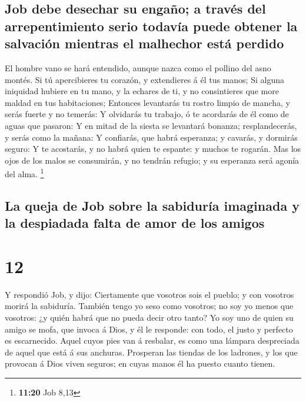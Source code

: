 \hypertarget{job-debe-desechar-su-engauxf1o-a-travuxe9s-del-arrepentimiento-serio-todavuxeda-puede-obtener-la-salvaciuxf3n-mientras-el-malhechor-estuxe1-perdido}{%
\subsection{Job debe desechar su engaño; a través del arrepentimiento
serio todavía puede obtener la salvación mientras el malhechor está
perdido}\label{job-debe-desechar-su-engauxf1o-a-travuxe9s-del-arrepentimiento-serio-todavuxeda-puede-obtener-la-salvaciuxf3n-mientras-el-malhechor-estuxe1-perdido}}

 El hombre vano se hará entendido, aunque nazca como el
pollino del asno montés.  Si tú apercibieres tu corazón, y
extendieres á él tus manos;  Si alguna iniquidad hubiere en
tu mano, y la echares de ti, y no consintieres que more maldad en tus
habitaciones;  Entonces levantarás tu rostro limpio de
mancha, y serás fuerte y no temerás:  Y olvidarás tu
trabajo, ó te acordarás de él como de aguas que pasaron:  Y
en mitad de la siesta se levantará bonanza; resplandecerás, y serás como
la mañana:  Y confiarás, que habrá esperanza; y cavarás, y
dormirás seguro:  Y te acostarás, y no habrá quien te
espante: y muchos te rogarán.  Mas los ojos de los malos se
consumirán, y no tendrán refugio; y su esperanza será agonía del alma.
\footnote{\textbf{11:20} Job 8,13}

\hypertarget{la-queja-de-job-sobre-la-sabiduruxeda-imaginada-y-la-despiadada-falta-de-amor-de-los-amigos}{%
\subsection{La queja de Job sobre la sabiduría imaginada y la despiadada
falta de amor de los
amigos}\label{la-queja-de-job-sobre-la-sabiduruxeda-imaginada-y-la-despiadada-falta-de-amor-de-los-amigos}}

\hypertarget{section-11}{%
\section{12}\label{section-11}}

 Y respondió Job, y dijo:  Ciertamente que
vosotros sois el pueblo; y con vosotros morirá la sabiduría.
 También tengo yo seso como vosotros; no soy yo menos que
vosotros: ¿y quién habrá que no pueda decir otro tanto?  Yo
soy uno de quien su amigo se mofa, que invoca á Dios, y él le responde:
con todo, el justo y perfecto es escarnecido.  Aquel cuyos
pies van á resbalar, es como una lámpara despreciada de aquel que está á
sus anchuras.  Prosperan las tiendas de los ladrones, y los
que provocan á Dios viven seguros; en cuyas manos él ha puesto cuanto
tienen.

